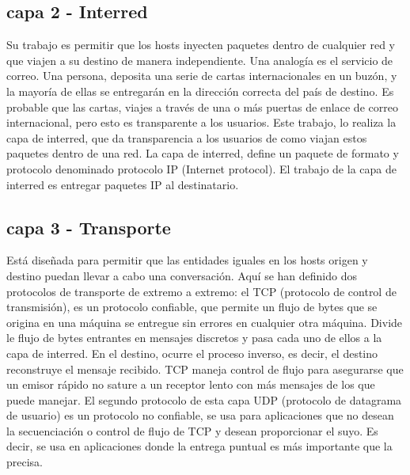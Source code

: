 \subsection{capa 2 - Interred}
Su trabajo es permitir que los hosts inyecten paquetes dentro de cualquier red y que viajen a su destino de manera independiente. Una analogía es el servicio de correo. Una persona, deposita una serie de cartas internacionales en un buzón, y la mayoría de ellas se entregarán en la dirección correcta del país de destino. Es probable que las cartas, viajes a través de una o más puertas de enlace de correo internacional, pero esto es transparente a los usuarios. Este trabajo, lo realiza la capa de interred, que da transparencia a los usuarios de como viajan estos paquetes dentro de una red. 
La capa de interred, define un paquete de formato y protocolo denominado protocolo IP (Internet protocol). El trabajo de la capa de interred es entregar paquetes IP al destinatario. 

\subsection{capa 3 - Transporte}
Está diseñada para permitir que las entidades iguales en los hosts origen y destino puedan llevar a cabo una conversación. Aquí se han definido dos protocolos de transporte de extremo a extremo: el TCP (protocolo de control de transmisión), es un protocolo confiable, que permite un flujo de bytes que se origina en una máquina se entregue sin errores en cualquier otra máquina. Divide le flujo de bytes entrantes en mensajes discretos y pasa cada uno de ellos a la capa de interred. En el destino, ocurre el proceso inverso, es decir, el destino reconstruye el mensaje recibido. TCP maneja control de flujo para asegurarse que un emisor rápido no sature a un receptor lento con más mensajes de los que puede manejar. 
El segundo protocolo de esta capa UDP (protocolo de datagrama de usuario) es un protocolo no confiable, se usa para aplicaciones que no desean la secuenciación o control de flujo de TCP y desean proporcionar el suyo. Es decir, se usa en aplicaciones donde la entrega puntual es más importante que la precisa. 



